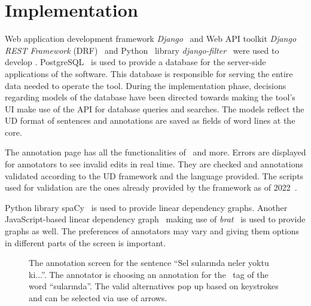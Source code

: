 \section{Implementation}
\label{sec:implementation}

Web application development framework \textit{Django}~\cite{django} and Web API toolkit \textit{Django REST Framework} (DRF)~\cite{drf} and Python~\cite{python} library \textit{django-filter}~\cite{django-filter} were used to develop \boatvtwo.
PostgreSQL~\cite{psql} is used to provide a database for the server-side applications of the software.
This database is responsible for serving the entire data needed to operate the tool.
During the implementation phase, decisions regarding models of the database have been directed towards making the tool's UI make use of the API for database queries and searches.
The models reflect the UD format of sentences and annotations are saved as fields of word lines at the core.

The annotation page has all the functionalities of \boatvone\ and more.
Errors are displayed for annotators to see invalid edits in real time.
They are checked and annotations validated according to the UD framework and the language provided.
The scripts used for validation are the ones already provided by the framework as of 2022~\cite{UD-git}.

Python library spa\textsc{C}y~\cite{spacy} is used to provide linear dependency graphs.
Another JavaScript-based linear dependency graph~\cite{spyssalo} making use of \textit{brat}~\cite{brat-vis} is used to provide graphs as well.
The preferences of annotators may vary and giving them options in different parts of the screen is important.

\begin{figure}[tbh]
    \centering
    \caption{The annotation screen for the sentence ``Sel sularında neler yoktu ki...''. The annotator is choosing an annotation for the \deprel\ tag of the word ``sularında''. The valid alternatives pop up based on keystrokes and can be selected via use of arrows. }
    \label{fig:demo-fig}
\end{figure}

